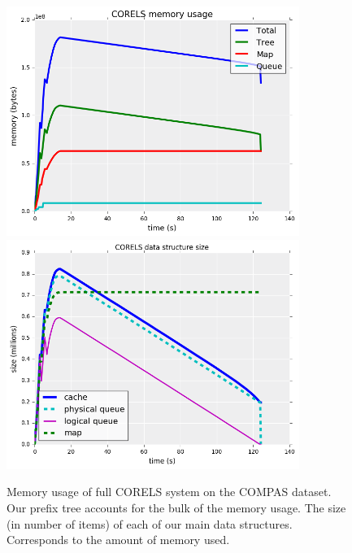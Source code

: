 \begin{figure}
\begin{center}
\begin{minipage}{\textwidth}
\vspace{-1.3cm}
\includegraphics[width=0.85\textwidth]{figs/corels_mem.png}
\includegraphics[width=0.85\textwidth]{figs/corels_size.png}
\vspace{-0.5cm}
\caption{Memory usage of full CORELS system on the COMPAS dataset. 
Our prefix tree accounts for the bulk of the memory usage.
The size (in number of items) of each of our main data structures.
Corresponds to the amount of memory used.}
\label{fig:corels-mem}
\end{minipage}
\end{center}
\end{figure}

